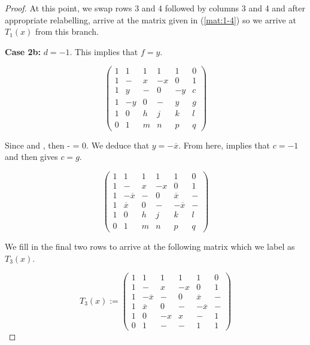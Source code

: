 \begin{lemma}
\begin{proof}
At this point, we swap rows 3 and 4 followed by columns 3 and 4 and after appropriate relabelling, arrive at the matrix given in (\ref{mat:1-4}) so we arrive at $T_1(x)$ from this branch.

{\bf Case 2b:} $d = -1$. This implies that $f = y$.

\begin{equation}  \label{mat:2b-1}
\left(\begin{array}{rrrrrr}
 1 &  1 & 1 & 1 & 1 & 0 \\
 1 &  - & x & -x & 0 & 1 \\
 1 &  y & - & 0 & -y & c \\
 1 &  -y & 0 & - & y & g \\ \hline
 1 &  0 & h & j & k & l \\
 0 &  1 & m & n & p & q
\end{array}\right)
\end{equation}

Since  and , then  -  = 0. We deduce that $y = -\overline{x}$. From here,  implies that $c = -1$ and then  gives $c=g$.

\begin{equation}  \label{mat:2b-2}
\left(\begin{array}{rrrrrr}
 1 &  1 & 1 &  1 &  1 & 0 \\
 1 &  - & x & -x &  0 & 1 \\
 1 &  -\overline{x} & - &  0 & \overline{x} & - \\
 1 & \overline{x} & 0 &  - &  -\overline{x} & - \\ \hline
 1 &  0 & h & j & k & l \\
 0 &  1 & m & n & p & q
\end{array}\right)
\end{equation}

We fill in the final two rows to arrive at the following matrix which we label as $T_3(x)$.

\begin{equation} \label{mat:T_3}
T_3(x) := \left(\begin{array}{rrrrrr}
             1 &  1       & 1 &  1 &         1 & 0 \\
             1 &  -       & x & -x &         0 & 1 \\
             1 & -\overline{x} & - &  0 &   \overline{x} & - \\
             1 & \overline{x}  & 0 &  - &  -\overline{x} & - \\
             1 &        0 & -x & x &         - & 1 \\
             0 &        1 &  - & - &         1 & 1
            \end{array}\right)
\end{equation}


\end{proof}
\end{lemma}
